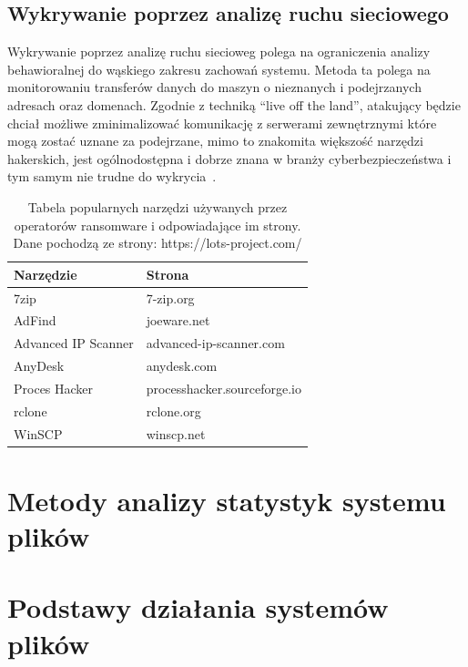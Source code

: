 \subsection{Wykrywanie poprzez analizę ruchu sieciowego}
Wykrywanie poprzez analizę ruchu siecioweg polega na ograniczenia analizy behawioralnej do wąskiego zakresu zachowań systemu.
Metoda ta polega na monitorowaniu transferów danych do maszyn o nieznanych i podejrzanych adresach
oraz domenach. Zgodnie z techniką \foreignquote{english}{live off the land}, atakujący będzie chciał
możliwe zminimalizować komunikację z serwerami zewnętrznymi które mogą zostać uznane za podejrzane, mimo to 
znakomita większość narzędzi hakerskich, jest ogólnodostępna i dobrze znana w branży
cyberbezpieczeństwa i tym samym nie trudne do wykrycia~\cite{sans_secure}.  
\begin{table}[H]
    \centering
    \begin{tabular}{ll}
    \hline
    \multicolumn{1}{|l|}{Narzędzie} & \multicolumn{1}{l|}{Strona}  \\ \hline
    7zip                            & 7-zip.org                    \\
    AdFind                          & joeware.net                  \\
    Advanced IP Scanner             & advanced-ip-scanner.com      \\
    AnyDesk                         & anydesk.com                  \\
    Proces Hacker                   & processhacker.sourceforge.io \\
    rclone                          & rclone.org                   \\
    WinSCP                          & winscp.net                  
    \end{tabular}
    \caption{Tabela popularnych narzędzi używanych przez operatorów ransomware i odpowiadające im strony. Dane pochodzą ze strony: https://lots-project.com/}
\end{table}
\section{Metody analizy statystyk systemu plików}
\section{Podstawy działania systemów plików}
 